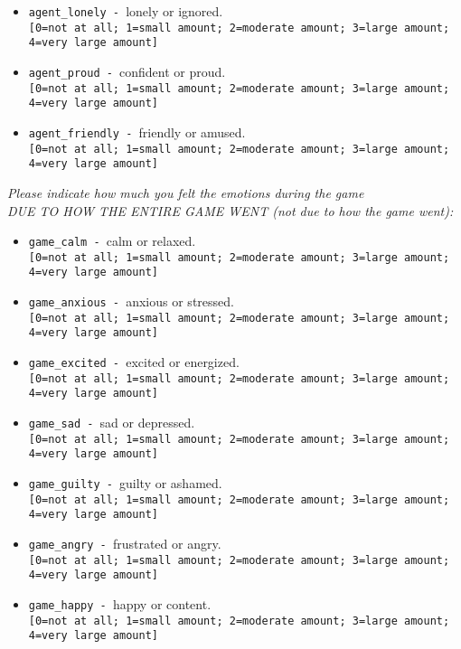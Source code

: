 \begin{description}
\begin{addmargin}[0em]{0em}
\begin{addmargin}[1em]{0em}
\begin{itemize}
            \item \verb|agent_lonely - |lonely or ignored.\\\verb|[0=not at all; 1=small amount; 2=moderate amount; 3=large amount; 4=very large amount]|
            \item \verb|agent_proud - |confident or proud.\\\verb|[0=not at all; 1=small amount; 2=moderate amount; 3=large amount; 4=very large amount]|
            \item \verb|agent_friendly - |friendly or amused.\\\verb|[0=not at all; 1=small amount; 2=moderate amount; 3=large amount; 4=very large amount]|
        \end{itemize}
        \begin{addmargin}[1em]{0em}
            \textit{Please indicate how much you felt the emotions during the game\\DUE TO HOW THE ENTIRE GAME WENT (not due to how the game went):}
        \end{addmargin}
        \begin{itemize}
            \item \verb|game_calm - |calm or relaxed.\\\verb|[0=not at all; 1=small amount; 2=moderate amount; 3=large amount; 4=very large amount]|
            \item \verb|game_anxious - |anxious or stressed.\\\verb|[0=not at all; 1=small amount; 2=moderate amount; 3=large amount; 4=very large amount]|
            \item \verb|game_excited - |excited or energized.\\\verb|[0=not at all; 1=small amount; 2=moderate amount; 3=large amount; 4=very large amount]|
            \item \verb|game_sad - |sad or depressed.\\\verb|[0=not at all; 1=small amount; 2=moderate amount; 3=large amount; 4=very large amount]|
            \item \verb|game_guilty - |guilty or ashamed.\\\verb|[0=not at all; 1=small amount; 2=moderate amount; 3=large amount; 4=very large amount]|
            \item \verb|game_angry - |frustrated or angry.\\\verb|[0=not at all; 1=small amount; 2=moderate amount; 3=large amount; 4=very large amount]|
            \item \verb|game_happy - |happy or content.\\\verb|[0=not at all; 1=small amount; 2=moderate amount; 3=large amount; 4=very large amount]|

\end{itemize}
\end{addmargin}
\end{addmargin}
\end{description}
